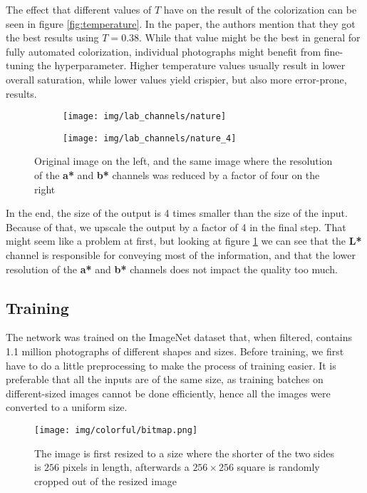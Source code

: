 The effect that different values of $T$ have on the result of the colorization
can be seen in figure \ref{fig:temperature}. In the paper, the authors mention
that they got the best results using $T=0.38$. While that value might be the best
in general for fully automated colorization, individual photographs might benefit
from fine-tuning the hyperparameter. Higher temperature values usually result in 
lower overall saturation, while lower values yield crispier, but also more error-prone, results.

\begin{figure}[!h]
	\centering
	\begin{subfigure}{.49\textwidth}
		\centering
		\texttt{[image: img/lab\_channels/nature]}
	\end{subfigure}
	\begin{subfigure}{.49\textwidth}
		\centering
		\texttt{[image: img/lab\_channels/nature\_4]}
	\end{subfigure}
    \caption{Original image on the left, and the same image where the resolution of the \textbf{a*} and \textbf{b*} channels was reduced by a factor of four on the right}
	\label{fig:color4}
\end{figure}

In the end, the size of the output is 4 times smaller than the size of the input. 
Because of that, we upscale the output by a factor of 4 in the final step. That might
seem like a problem at first, but looking at figure \ref{fig:color4} we can see
that the \textbf{L*} channel is responsible for conveying most of the information, and
that the lower resolution of the \textbf{a*} and \textbf{b*} channels does not impact
the quality too much.

\subsection{Training}

The network was trained on the ImageNet dataset that, when filtered, contains
1.1 million photographs of different shapes and sizes. Before training, we first
have to do a little preprocessing to make the process of training easier. It is 
preferable that all the inputs are of the same size, as training batches on 
different-sized images cannot be done efficiently, hence all the images were 
converted to a uniform size. 

\begin{figure}[!h]
	\centering
	\texttt{[image: img/colorful/bitmap.png]}
    \caption{
	The image is first resized to a size where the shorter of the two sides
	is $256$ pixels in length, afterwards a $256\times256$ square is 
	randomly cropped out of the resized image}
	\label{fig:crop}
\end{figure}

